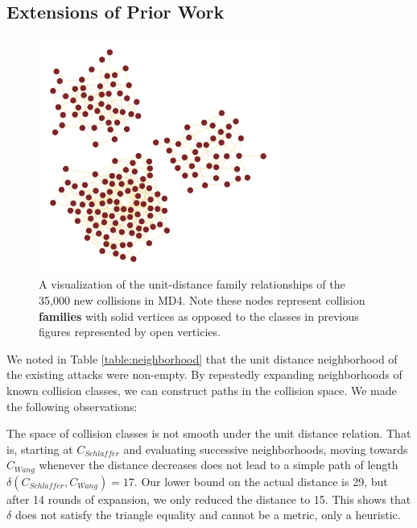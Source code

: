 \documentclass[conference]{IEEEtran}
\begin{document}
\subsection{Extensions of Prior Work}

\begin{figure}
\begin{center}
\includegraphics[width=0.7\textwidth]{Figs/families48.pdf}
\caption{A visualization of the unit-distance family relationships
of the 35,000 new collisions in MD4. Note these nodes represent
collision \textbf{families} with solid vertices as opposed to the
classes in previous figures represented by open verticies.}
\label{Fig:Families48}
\end{center}
\end{figure}

We noted in Table \ref{table:neighborhood} that the unit distance neighborhood of
the existing attacks were non-empty. By repeatedly expanding neighborhoods of
known collision classes, we can construct paths in the collision space. We
made the following observations:

The space of collision classes is not smooth under the unit distance
relation. That is, starting at $C_{Schlaffer}$ and evaluating
successive neighborhoods, moving towards $C_{Wang}$ whenever the
distance decreases does not lead to a simple path of length
$\delta(C_{Schlaffer}, C_{Wang}) = 17$. Our lower bound on the actual
distance is 29, but after 14 rounds of expansion, we only reduced the
distance to 15. This shows that $\delta$ does not satisfy the triangle
equality and cannot be a metric, only a heuristic.
\end{document}
